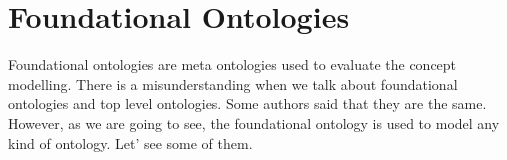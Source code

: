 \section{Foundational Ontologies\label{sec:fonto}}
Foundational ontologies are meta ontologies used to evaluate the concept modelling. There is a misunderstanding when we talk about foundational ontologies and top level ontologies.  Some authors said that they are the same. However, as we are going to see, the foundational ontology is used to model any kind of ontology. Let’ see some of them.



